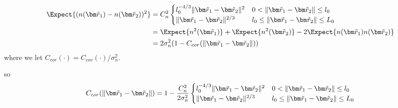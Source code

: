 \begin{equation}\label{EQ:structure_function}
\begin{split}
  \Expect{(n(\vect{\dim{r}}_1) - n(\vect{\dim{r}}_2))^2} &= 
  C_n^2  \begin{cases}
        l_{0}^{-4/3} \|\vect{\dim{r}}_1-\vect{\dim{r}}_2\|^{2} & 0 < \|\vect{\dim{r}}_1-\vect{\dim{r}}_2\| \leq l_{0} \\
       \|\vect{\dim{r}}_1 - \vect{\dim{r}}_2 \|^{2/3} &  l_{0}  \leq \|\vect{\dim{r}}_1 - \vect{\dim{r}}_2\| \leq  L_{0}  \\
   \end{cases}\\
   &= \Expect{n^2(\vect{\dim{r}}_1)} +  \Expect{n^2(\vect{\dim{r}}_2)} - 2\Expect{n(\vect{\dim{r}}_1)n(\vect{\dim{r}}_2)} \\
   &= 2\sigma_{n}^{2}( 1-C_{cor}(\| \vect{\dim{r}}_1 - \vect{\dim{r}}_2\|) )
\end{split}
\end{equation}
where we let $C_{cor}(\cdot) = C_{cov}(\cdot)/\sigma_{n}^{2}$.

so
\begin{equation}\label{EQ:correlation}
  C_{cor}(\|\vect{\dim{r}}_1-\vect{\dim{r}}_{2}\|) = 1 - \frac{C_n^2}{2\sigma_n^2}
    \begin{cases}
        l_{0}^{-4/3} \|\vect{\dim{r}}_1-\vect{\dim{r}}_{2}\|^{2} & 0 < \|\vect{\dim{r}}_1-\vect{\dim{r}}_{2}\| \leq l_{0} \\
        \|\vect{\dim{r}}_1-\vect{\dim{r}}_{2}\|^{2/3} &  l_{0}  \leq \|\vect{\dim{r}}_1-\vect{\dim{r}}_{2}\| \leq  L_{0}  \\
   \end{cases}
\end{equation}

